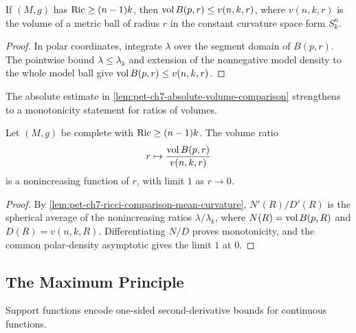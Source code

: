 \begin{lemma}
  \label{lem:pet-ch7-absolute-volume-comparison}

  If $(M,g)$ has $\operatorname{Ric}\ge(n-1)k$, then $\operatorname{vol} B(p,r)\le v(n,k,r)$, where
  $v(n,k,r)$ is the volume of a metric ball of radius $r$ in the constant
  curvature space form $S^n_k$.
\end{lemma}
\begin{proof}
  \sketch
  In polar coordinates, integrate \(\lambda\) over the segment domain of \(B(p,r)\). The pointwise bound \(\lambda\le\lambda_k\) and extension of the nonnegative model density to the whole model ball give \(\operatorname{vol} B(p,r)\le v(n,k,r)\).
\end{proof}

The absolute estimate in \cref{lem:pet-ch7-absolute-volume-comparison}
strengthens to a monotonicity statement for ratios of volumes.

\begin{lemma}
  \label{lem:pet-ch7-relative-volume-comparison}

  Let $(M,g)$ be complete with $\operatorname{Ric}\ge(n-1)k$. The volume ratio
  \[
    r\mapsto\frac{\operatorname{vol} B(p,r)}{v(n,k,r)}
  \]
  is a nonincreasing function of $r$, with limit $1$ as $r\to0$.
\end{lemma}
\begin{proof}
  \sketch
  By \cref{lem:pet-ch7-ricci-comparison-mean-curvature}, \(N'(R)/D'(R)\) is the spherical average of the nonincreasing ratios \(\lambda/\lambda_k\), where \(N(R)=\operatorname{vol} B(p,R)\) and \(D(R)=v(n,k,R)\). Differentiating \(N/D\) proves monotonicity, and the common polar-density asymptotic gives the limit \(1\) at \(0\).
\end{proof}

\subsection{The Maximum Principle}

Support functions encode one-sided second-derivative bounds for continuous
functions.

